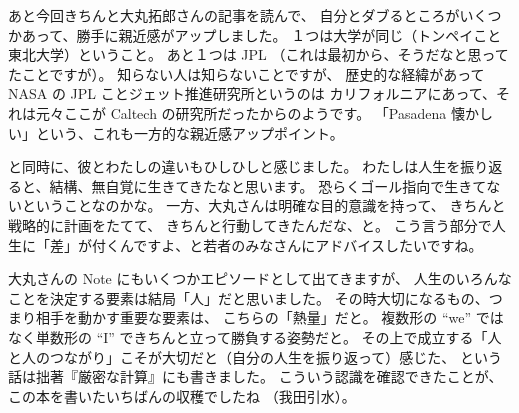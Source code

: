 \documentclass[dvipdfmx,autodetect-engine,10pt,b5paper,papersize,openany,dvipsnames]{jsbook}
\begin{document}
\begin{multicols}{2}
あと今回きちんと大丸拓郎さんの記事を読んで、
自分とダブるところがいくつかあって、勝手に親近感がアップしました。
１つは大学が同じ（トンペイこと東北大学）ということ。
あと１つは JPL （これは最初から、そうだなと思ってたことですが）。
知らない人は知らないことですが、
歴史的な経緯があって NASA の JPL ことジェット推進研究所というのは
カリフォルニアにあって、それは元々ここが Caltech の研究所だったからのようです。
「Pasadena 懐かしい」という、これも一方的な親近感アップポイント。


と同時に、彼とわたしの違いもひしひしと感じました。
わたしは人生を振り返ると、結構、無自覚に生きてきたなと思います。
恐らくゴール指向で生きてないということなのかな。
一方、大丸さんは明確な目的意識を持って、
きちんと戦略的に計画をたてて、
きちんと行動してきたんだな、と。
こう言う部分で人生に「差」が付くんですよ、と若者のみなさんにアドバイスしたいですね。


大丸さんの Note にもいくつかエピソードとして出てきますが、
人生のいろんなことを決定する要素は結局「人」だと思いました。
その時大切になるもの、つまり相手を動かす重要な要素は、
こちらの「熱量」だと。
複数形の ``we'' ではなく単数形の ``I'' できちんと立って勝負する姿勢だと。
その上で成立する「人と人のつながり」こそが大切だと（自分の人生を振り返って）感じた、
という話は拙著『厳密な計算』にも書きました。
こういう認識を確認できたことが、この本を書いたいちばんの収穫でしたね
（我田引水）。



\end{multicols}
\end{document}
